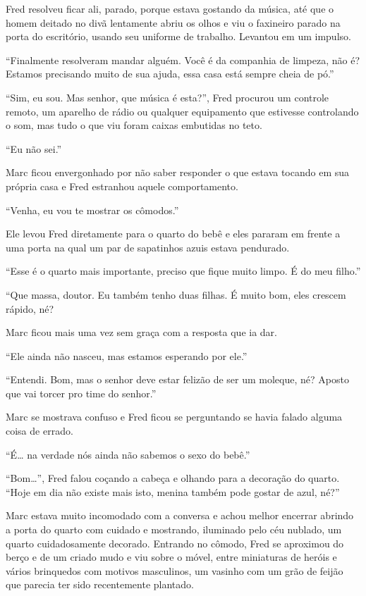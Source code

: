Fred resolveu ficar ali, parado, porque estava gostando da música, até
que o homem deitado no divã lentamente abriu os olhos e viu o faxineiro
parado na porta do escritório, usando seu uniforme de trabalho. Levantou
em um impulso.

``Finalmente resolveram mandar alguém. Você é da companhia de limpeza,
não é? Estamos precisando muito de sua ajuda, essa casa está sempre
cheia de pó.''

``Sim, eu sou. Mas senhor, que música é esta?'', Fred procurou um
controle remoto, um aparelho de rádio ou qualquer equipamento que
estivesse controlando o som, mas tudo o que viu foram caixas embutidas
no teto.

``Eu não sei.''

Marc ficou envergonhado por não saber responder o que estava tocando em
sua própria casa e Fred estranhou aquele comportamento.

``Venha, eu vou te mostrar os cômodos.''

Ele levou Fred diretamente para o quarto do bebê e eles pararam em
frente a uma porta na qual um par de sapatinhos azuis estava pendurado.

``Esse é o quarto mais importante, preciso que fique muito limpo. É do
meu filho.''

``Que massa, doutor. Eu também tenho duas filhas. É muito bom, eles
crescem rápido, né?

Marc ficou mais uma vez sem graça com a resposta que ia dar.

``Ele ainda não nasceu, mas estamos esperando por ele.''

``Entendi. Bom, mas o senhor deve estar felizão de ser um moleque, né?
Aposto que vai torcer pro time do senhor.''

Marc se mostrava confuso e Fred ficou se perguntando se havia falado
alguma coisa de errado.

``É\ldots{} na verdade nós ainda não sabemos o sexo do bebê.''

``Bom\ldots{}'', Fred falou coçando a cabeça e olhando para a decoração do
quarto. ``Hoje em dia não existe mais isto, menina também pode gostar de
azul, né?''

Marc estava muito incomodado com a conversa e achou melhor encerrar
abrindo a porta do quarto com cuidado e mostrando, iluminado pelo céu
nublado, um quarto cuidadosamente decorado. Entrando no cômodo, Fred se
aproximou do berço e de um criado mudo e viu sobre o móvel, entre
miniaturas de heróis e vários brinquedos com motivos masculinos, um
vasinho com um grão de feijão que parecia ter sido recentemente
plantado.

